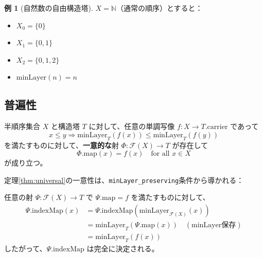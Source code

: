 \documentclass[a4paper,12pt]{ltjsarticle}
\theoremstyle{definition}
\newtheorem{example}[theorem]{例}
\newcommand{\N}{\mathbb{N}}
\begin{document}
\begin{example}[自然数の自由構造塔]
$X = \N$（通常の順序）とすると：
\begin{itemize}
\item $X_0 = \{0\}$
\item $X_1 = \{0, 1\}$
\item $X_2 = \{0, 1, 2\}$
\item $\mathrm{minLayer}(n) = n$
\end{itemize}
\end{example}

\begin{center}
\end{center}

\subsection{普遍性}

\begin{maintheorem}[自由構造塔の普遍性]\label{thm:universal}
半順序集合 $X$ と構造塔 $T$ に対して、任意の単調写像 $f : X \to T.\mathrm{carrier}$ であって
\[
x \leq y \Rightarrow \mathrm{minLayer}_T(f(x)) \leq \mathrm{minLayer}_T(f(y))
\]
を満たすものに対して、\textbf{一意的な}射 $\Phi : \mathcal{F}(X) \to T$ が存在して
\[
\Phi.\mathrm{map}(x) = f(x) \quad \text{for all } x \in X
\]
が成り立つ。
\end{maintheorem}

\begin{keyidea}[普遍性の一意性の鍵]
定理\ref{thm:universal}の一意性は、\texttt{minLayer\_preserving}条件から導かれる：

任意の射 $\Psi : \mathcal{F}(X) \to T$ で $\Psi.\mathrm{map} = f$ を満たすものに対して、
\begin{align*}
\Psi.\mathrm{indexMap}(x)
&= \Psi.\mathrm{indexMap}(\mathrm{minLayer}_{\mathcal{F}(X)}(x)) \\
&= \mathrm{minLayer}_T(\Psi.\mathrm{map}(x)) \quad (\text{minLayer保存}) \\
&= \mathrm{minLayer}_T(f(x))
\end{align*}
したがって、$\Psi.\mathrm{indexMap}$ は完全に決定される。
\end{keyidea}
\end{document}
